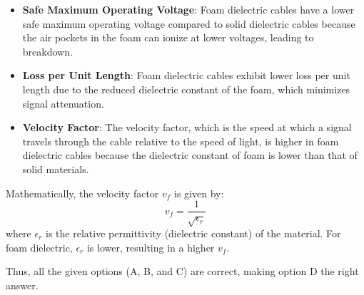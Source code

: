 \begin{itemize}
    \item \textbf{Safe Maximum Operating Voltage}: Foam dielectric cables have a lower safe maximum operating voltage compared to solid dielectric cables because the air pockets in the foam can ionize at lower voltages, leading to breakdown.
    \item \textbf{Loss per Unit Length}: Foam dielectric cables exhibit lower loss per unit length due to the reduced dielectric constant of the foam, which minimizes signal attenuation.
    \item \textbf{Velocity Factor}: The velocity factor, which is the speed at which a signal travels through the cable relative to the speed of light, is higher in foam dielectric cables because the dielectric constant of foam is lower than that of solid materials.
\end{itemize}

Mathematically, the velocity factor \( v_f \) is given by:
\[
v_f = \frac{1}{\sqrt{\epsilon_r}}
\]
where \( \epsilon_r \) is the relative permittivity (dielectric constant) of the material. For foam dielectric, \( \epsilon_r \) is lower, resulting in a higher \( v_f \).

Thus, all the given options (A, B, and C) are correct, making option D the right answer.


